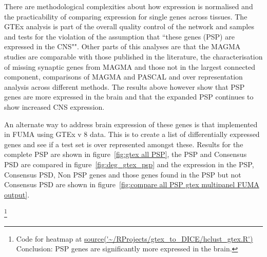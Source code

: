 There are methodological complexities about how expression is normalised and the practicability of comparing expression for single genes across tissues. The GTEx analysis is part of the overall quality control of the network and samples and tests for the violation of the assumption that ``these genes (PSP) are expressed in the CNS"". Other parts of this analyses are that the MAGMA studies are comparable with those published in the literature, the characterisation of missing synaptic genes from MAGMA and those not in the largest connected component, comparisons of MAGMA and PASCAL and over representation analysis across different methods. The results above however show that PSP genes are more expressed in the brain and that the expanded PSP continues to show increased CNS expression. 

An alternate way to address brain expression of these genes is that implemented in FUMA using GTEx v 8 data. This is to create a list of differentially expressed genes and see if a test set is over represented amongst these. Results for the complete PSP are shown in figure~\ref{fig:gtex all PSP}, the PSP and Consensus PSD are compared in figure~\ref{fig:deg_gtex_psp} and the expression in the PSP, Consensus PSD, Non PSP genes and those genes found in the PSP but not Consensus PSD are shown in figure~\ref{fig:compare all PSP gtex multipanel FUMA output}. 




 


\footnote{Code for heatmap at \url{source('~/RProjects/gtex_to_DICE/hclust_gtex.R')}
Conclusion: PSP genes are significantly more expressed in the brain. }

